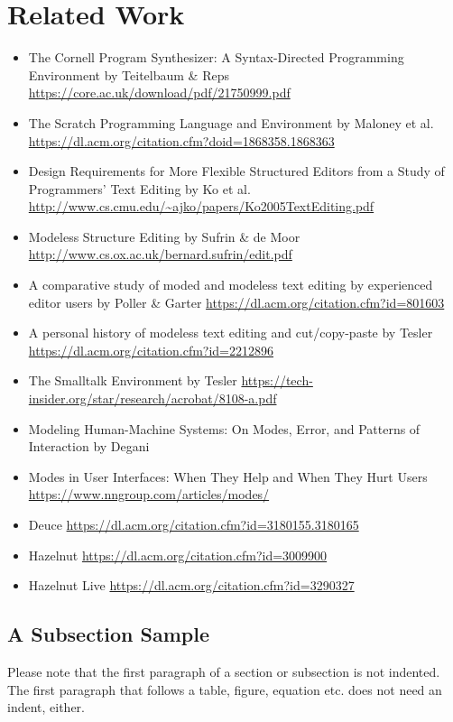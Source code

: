 \documentclass[runningheads]{llncs}
\begin{document}
\section{Related Work}
\begin{itemize}
\item The Cornell Program Synthesizer: A Syntax-Directed Programming Environment by Teitelbaum \& Reps \url{https://core.ac.uk/download/pdf/21750999.pdf}
\item The Scratch Programming Language and Environment by Maloney et al. \url{https://dl.acm.org/citation.cfm?doid=1868358.1868363}
\item Design Requirements for More Flexible Structured Editors from a Study of Programmers' Text Editing by Ko et al. \url{http://www.cs.cmu.edu/~ajko/papers/Ko2005TextEditing.pdf}
\item Modeless Structure Editing by Sufrin \& de Moor \url{http://www.cs.ox.ac.uk/bernard.sufrin/edit.pdf}
\item A comparative study of moded and modeless text editing by experienced editor users by Poller \& Garter \url{https://dl.acm.org/citation.cfm?id=801603}
\item A personal history of modeless text editing and cut/copy-paste by Tesler \url{https://dl.acm.org/citation.cfm?id=2212896}
\item The Smalltalk Environment by Tesler \url{https://tech-insider.org/star/research/acrobat/8108-a.pdf}
\item Modeling Human-Machine Systems: On Modes, Error, and Patterns of Interaction by Degani %
\item Modes in User Interfaces: When They Help and When They Hurt Users \url{https://www.nngroup.com/articles/modes/}

\item Deuce \url{https://dl.acm.org/citation.cfm?id=3180155.3180165}
\item Hazelnut \url{https://dl.acm.org/citation.cfm?id=3009900}
\item Hazelnut Live \url{https://dl.acm.org/citation.cfm?id=3290327}
\end{itemize}

\newpage
\subsection{A Subsection Sample}
Please note that the first paragraph of a section or subsection is
not indented. The first paragraph that follows a table, figure,
equation etc. does not need an indent, either.
\end{document}
